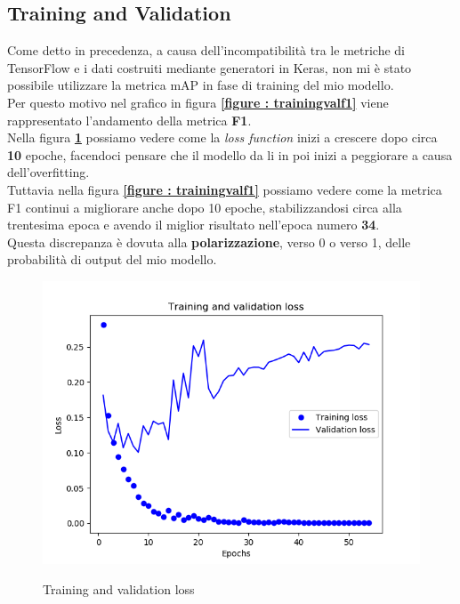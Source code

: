 \subsection{Training and Validation}
Come detto in precedenza, a causa dell'incompatibilità tra le metriche di TensorFlow e i dati costruiti mediante generatori in Keras, non mi è stato possibile  utilizzare la metrica mAP in fase di training del mio modello.
\\Per questo motivo nel grafico in figura \textbf{\ref{figure : trainingvalf1}} viene rappresentato l'andamento della metrica \textbf{F1}.
\\Nella figura \textbf{\ref{figure : trainingvalloss}} possiamo vedere come la \textit{loss function} inizi a crescere dopo circa \textbf{10} epoche, facendoci pensare che il modello da li in poi inizi a peggiorare a causa dell'overfitting.
\\Tuttavia nella figura \textbf{\ref{figure : trainingvalf1}} possiamo vedere come la metrica F1 continui a migliorare anche dopo 10 epoche, stabilizzandosi circa alla trentesima epoca e avendo il miglior risultato nell'epoca numero \textbf{34}.
\\Questa discrepanza è dovuta alla \textbf{polarizzazione}, verso 0 o verso 1, delle probabilità di output del mio modello.
\begin{figure}[ht]
\centering
\caption{Training and validation loss}
\includegraphics[width=\linewidth]{img/training-validation-loss.png}
\label{figure : trainingvalloss}
\end{figure}
